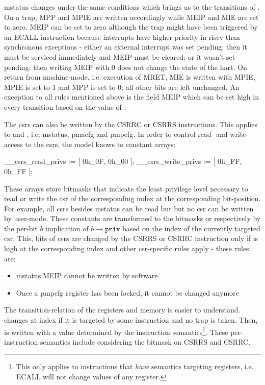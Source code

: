 \gls{mstatus} changes under the same conditions which brings us to the transitions of .
On a trap, MPP and MPIE are written accordingly while MEIP and MIE are set to zero.
MEIP can be set to zero although the trap might have been triggered by an ECALL instruction because interrupts have higher priority in \gls{riscv} than synchronous exceptions - either an external interrupt was set pending: then it must be serviced immediately and MEIP must be cleared; or it wasn't set pending: then writing MEIP with 0 does not change the state of the \gls{hart}.
On return from machine-mode, i.e. execution of MRET, MIE is written with MPIE, MPIE is set to 1 and MPP is set to 0; all other bits are left unchanged.
An exception to all rules mentioned above is the field MEIP which can be set high in every transition based on the value of .

The \glspl{csr} can also be written by the CSRRC or CSRRS instructions.
This applies to  and , i.e. \gls{mstatus}, \gls{pmacfg} and \gls{pmpcfg}.
In order to control read- and write-access to the \glspl{csr}, the model knows to constant arrays:
\begin{smv}
__csrs_read_privs := [ 0h_0F, 0h_00 ];
__csrs_write_privs := [ 0h_FF, 0h_FF ];
\end{smv}

These arrays store bitmasks that indicate the least privilege level necessary to read or write the \gls{csr} of the corresponding index at the corresponding bit-position.
For example, all \glspl{csr} besides \gls{mstatus} can be read but but no \gls{csr} can be written by user-mode.
These constants are transformed to the bitmasks  or  respectively by the per-bit $ b $ implication of $ b \rightarrow \texttt{priv} $ based on the index of the currently targeted \gls{csr}.
This, bits of \glspl{csr} are changed by the CSRRS or CSRRC instruction only if  is high at the corresponding index and other \gls{csr}-specific rules apply - these rules are:
\begin{itemize}
    \item \gls{mstatus}.MEIP cannot be written by software
    \item Once a \gls{pmpcfg} register has been locked, it cannot be changed anymore
\end{itemize}

The transition-relation of the registers and memory is easier to understand.
 changes at index  if it is targeted by some instruction and no trap is taken.
Then,  is written with a value determined by the instruction semantics\footnote{%
    This only applies to instructions that \textit{have} semantics targeting registers, i.e. ECALL will not change values of any register.
}.
These per-instruction semantics include considering the  bitmask on CSRRS and CSRRC.


